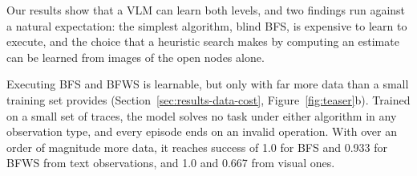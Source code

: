 Our results show that a VLM can learn both levels, and two findings run against a natural expectation: the simplest algorithm, blind BFS, is expensive to learn to execute, and the choice that a heuristic search makes by computing an estimate can be learned from images of the open nodes alone.

Executing BFS and BFWS is learnable, but only with far more data than a small training set provides (Section~\ref{sec:results-data-cost}, Figure~\ref{fig:teaser}b).
Trained on a small set of traces, the model solves no task under either algorithm in any observation type, and every episode ends on an invalid operation.
With over an order of magnitude more data, it reaches success of 1.0 for BFS and 0.933 for BFWS from text observations, and 1.0 and 0.667 from visual ones.

